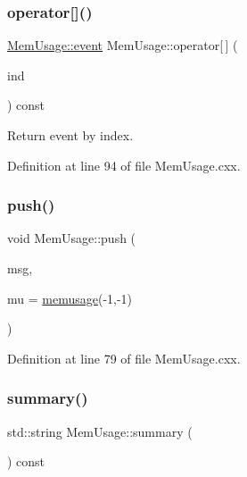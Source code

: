 \subsubsection{\texorpdfstring{operator[]()}{operator[]()}}
{\footnotesize\ttfamily \hyperlink{class_wire_cell_1_1_mem_usage_ac40a9ad5d6984d90924a179ca77aab3b}{Mem\+Usage\+::event} Mem\+Usage\+::operator\mbox{[}$\,$\mbox{]} (\begin{DoxyParamCaption}\item[{int}]{ind }\end{DoxyParamCaption}) const}



Return event by index. 



Definition at line 94 of file Mem\+Usage.\+cxx.

\mbox{\label{class_wire_cell_1_1_mem_usage_af58b3442b7ec01350398c8977541d06c}} 
\subsubsection{\texorpdfstring{push()}{push()}}
{\footnotesize\ttfamily void Mem\+Usage\+::push (\begin{DoxyParamCaption}\item[{const std\+::string \&}]{msg,  }\item[{\hyperlink{class_wire_cell_1_1_mem_usage_ab022bc829c4166d0161f3c91195f062f}{Mem\+Usage\+::memusage}}]{mu = {\ttfamily \hyperlink{class_wire_cell_1_1_mem_usage_ab022bc829c4166d0161f3c91195f062f}{memusage}(-\/1,-\/1)} }\end{DoxyParamCaption})}



Definition at line 79 of file Mem\+Usage.\+cxx.

\mbox{\label{class_wire_cell_1_1_mem_usage_acdcd1e9ea7c3e3bcb261be506eae47e9}} 
\subsubsection{\texorpdfstring{summary()}{summary()}}
{\footnotesize\ttfamily std\+::string Mem\+Usage\+::summary (\begin{DoxyParamCaption}{ }\end{DoxyParamCaption}) const}



